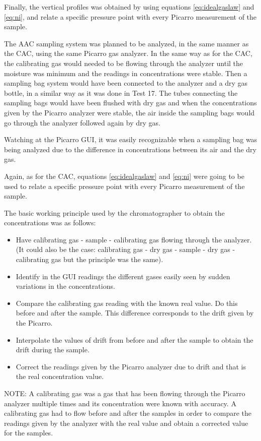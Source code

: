 Finally, the vertical profiles was obtained by using equations \ref{eq:idealgaslaw} and \ref{eq:ni}, and relate a specific pressure point with every Picarro measurement of the sample.   

The AAC sampling system was planned to be analyzed, in the same manner as the CAC, using the same Picarro gas analyzer. In the same way as for the CAC, the calibrating gas would needed to be flowing through the analyzer until the moisture was minimum and the readings in concentrations were stable. Then a sampling bag system would have been connected to the analyzer and a dry gas bottle, in a similar way as it was done in Test 17. The tubes connecting the sampling bags would have been flushed with dry gas and when the concentrations given by the Picarro analyzer were stable, the air inside the sampling bags would go through the analyzer followed again by dry gas.  

Watching at the Picarro GUI, it was easily recognizable when a sampling bag was being analyzed due to the difference in concentrations between its air and the dry gas. 

Again, as for the CAC, equations \ref{eq:idealgaslaw} and \ref{eq:ni} were going to be used to relate a specific pressure point with every Picarro measurement of the sample. 


The basic working principle used by the chromatographer to obtain the concentrations was as follows:
\begin{itemize}
    \item Have calibrating gas - sample - calibrating gas flowing through the analyzer. (It could also be the case: calibrating gas - dry gas - sample - dry gas - calibrating gas but the principle was the same). 
    \item Identify in the GUI readings the different gases easily seen by sudden variations in the concentrations. 
    \item Compare the calibrating gas reading with the known real value. Do this before and after the sample. This difference corresponds to the drift given by the Picarro. 
    \item Interpolate the values of drift from before and after the sample to obtain the drift during the sample. 
    \item Correct the readings given by the Picarro analyzer due to drift and that is the real concentration value. 
\end{itemize}

NOTE: A calibrating gas was a gas that has been flowing through the Picarro analyzer multiple times and its concentration were known with accuracy. A calibrating gas had to flow before and after the samples in order to compare the readings given by the analyzer with the real value and obtain a corrected value for the samples. 

